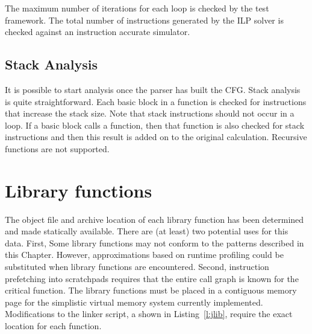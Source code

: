 The maximum number of iterations for each loop is checked by the test framework. The total number of instructions generated by the ILP solver is checked against an instruction accurate simulator. 


\subsection{Stack Analysis}
It is possible to start analysis once the parser has built the CFG. Stack analysis is quite straightforward. Each basic block in a function is checked for instructions that increase the stack size. Note that stack instructions should not occur in a loop. If a basic block calls a function, then that function is also checked for stack instructions and then this result is added on to the original calculation. Recursive functions are not supported.


\section{Library functions}

The object file and archive location of each library function has been determined and made statically available. There are (at least) two potential uses for this data. First, Some library functions may not conform to the patterns described in this Chapter. However, approximations based on runtime profiling could be substituted when library functions are encountered. Second, instruction prefetching into scratchpads requires that the entire call graph is known for the critical function. The library functions must be placed in a contiguous memory page for the simplistic virtual memory system currently implemented. Modifications to the linker script, a shown in Listing~\ref{l:jlib}, require the exact location for each function.


